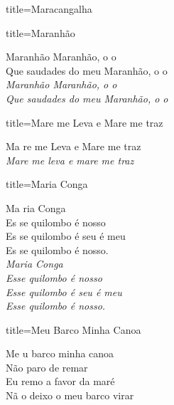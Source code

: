 \documentclass[fontsize=14pt, paper=a4, twoside, DIV=20]{scrreprt} %
\begin{document}
\begin{multicols*}{2}
\begin{song}{title={Maracangalha}}
\begin{verse*}
       
    \end{verse*}
\end{song}
\begin{song}{title={Maranhão}}
    \begin{verse*}
        Maranhão Maranhão, o o \\
        Que saudades do meu Maranhão, o o \\
        \textit{Maranhão Maranhão, o o \\
        Que saudades do meu Maranhão, o o \\}
    \end{verse*}
\end{song}

\begin{song}{title={Mare me Leva e Mare me traz}}
        \begin{verse*}
            Ma re me Leva e Mare me traz\\
            \textit{Mare me leva e mare me traz}\\
        \end{verse*}
\end{song}

\begin{song}{title={Maria Conga}}
        \begin{verse*}
            Ma ria Conga\\
            Es se quilombo é nosso\\
            Es se quilombo é seu é meu\\
            Es se quilombo é nosso.\\
            \textit{Maria Conga}\\
            \textit{Esse quilombo é nosso}\\
            \textit{Esse quilombo é seu é meu}\\
            \textit{Esse quilombo é nosso.}\\
        \end{verse*}
\end{song}

\begin{song}{title={Meu Barco Minha Canoa}}
        \begin{verse*}
            Me u barco minha canoa\\
            Não paro de remar\\
            Eu remo a favor da maré\\
            Nã o deixo o meu barco virar\\


\end{verse*}
\end{song}
\end{multicols*}
\end{document}
